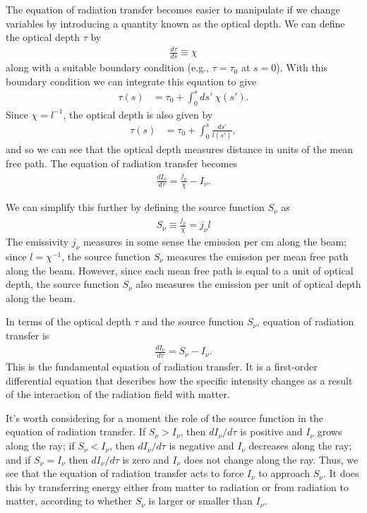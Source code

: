 \newslide

The equation of radiation transfer becomes easier to manipulate if we
change variables by introducing a quantity known as the optical depth.
We can define the optical depth $\tau$ by
\begin{align}
\frac{d\tau}{ds} \equiv \chi
\end{align}
along with a suitable boundary condition (e.g., $\tau = \tau_0$
at $s = 0$). With this boundary condition we can integrate
this equation to give
\begin{align}
\tau(s) &= \tau_0 + \int_0^s ds'\:\chi(s').
\end{align}
Since $\chi = l^{-1}$, the optical depth is also given by
\begin{align}
\tau(s) &= \tau_0 + \int_0^s \frac{ds'}{l(s')},
\end{align}
and so we can see that the optical depth measures distance in units of the mean free path. The equation of
radiation transfer becomes
\begin{align}
\frac{dI_\nu}{d\tau} = \frac{j_\nu}{\chi} - I_\nu.
\end{align}

\newslide

We can simplify this further by defining the source function $S_\nu$
as
\begin{align}
S_\nu \equiv \frac{j_\nu}{\chi} = j_\nu l
\end{align}
The emissivity $j_\nu$ measures in some sense the emission per cm along
the beam; since $l = \chi^{-1}$, the source function $S_\nu$ measures the emission per mean free path along
the beam. However, since each mean free path is equal to a unit of optical depth, the source function $S_\nu$ also measures the emission per unit of optical depth along the beam.

In terms of the optical depth $\tau$ and the source function $S_\nu$, equation of radiation transfer is
\begin{align}
\frac{dI_\nu}{d\tau} = S_\nu - I_\nu.
\end{align}
This is the fundamental equation of radiation transfer. It is a
first-order differential equation that describes how the specific
intensity changes as a result of the interaction of the radiation field
with matter. 

\newslide

It's worth considering for a moment the role of the source function in
the equation of radiation transfer. If $S_\nu > I_\nu$, then
$dI_\nu/d\tau$ is positive and $I_\nu$ grows along the ray; if
$S_\nu < I_\nu$, then $dI_\nu/d\tau$ is negative and $I_\nu$
decreases along the ray; and if $S_\nu =
I_\nu$ then $dI_\nu/d\tau$ is zero and $I_\nu$ does not change along
the ray. Thus, we see that the equation of radiation transfer acts to force $I_\nu$
to approach $S_\nu$. It does this by transferring energy either from matter to radiation or from radiation to matter, according to whether $S_\nu$ is larger or smaller than $I_\nu$.

